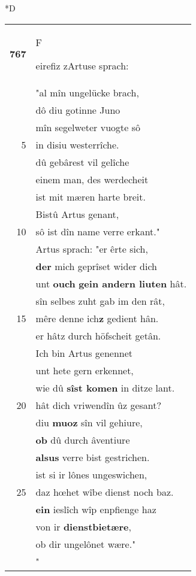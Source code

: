 \documentclass[8pt,a4paper,notitlepage]{article}
\begin{document}
\begin{table}[ht]
\begin{minipage}[t]{0.5\linewidth}
\small
\begin{center}*D
\end{center}
\begin{tabular}{rl}
\textbf{767} & \begin{large}F\end{large}eirefiz zArtuse sprach:\\ 
 & "al mîn ungelücke brach,\\ 
 & dô diu gotinne Juno\\ 
 & mîn segelweter vuogte sô\\ 
5 & in disiu westerrîche.\\ 
 & dû gebârest vil gelîche\\ 
 & einem man, des werdecheit\\ 
 & ist mit mæren harte breit.\\ 
 & Bistû Artus genant,\\ 
10 & sô ist dîn name verre erkant."\\ 
 & Artus sprach: "er êrte sich,\\ 
 & \textbf{der} mich geprîset wider dich\\ 
 & unt \textbf{ouch} \textbf{gein andern liuten} hât.\\ 
 & sîn selbes zuht gab im den rât,\\ 
15 & mêre denne ich\textbf{z} gedient hân.\\ 
 & er hâtz durch höfscheit getân.\\ 
 & Ich bin Artus genennet\\ 
 & unt hete gern erkennet,\\ 
 & wie dû \textbf{sîst komen} in ditze lant.\\ 
20 & hât dich vriwendîn ûz gesant?\\ 
 & diu \textbf{muoz} sîn vil gehiure,\\ 
 & \textbf{ob} dû durch âventiure\\ 
 & \textbf{alsus} verre bist gestrichen.\\ 
 & ist si ir lônes ungeswichen,\\ 
25 & daz hœhet wîbe dienst noch baz.\\ 
 & \textbf{ein} ieslîch wîp enpfienge haz\\ 
 & von ir \textbf{dienstbietære},\\ 
 & ob dir ungelônet wære."\\ 
 & "\textbf{\begin{large}E\end{large}z wirt al anders vernomen}",\\ 

\end{tabular}
\end{minipage}
\end{table}
\end{document}
